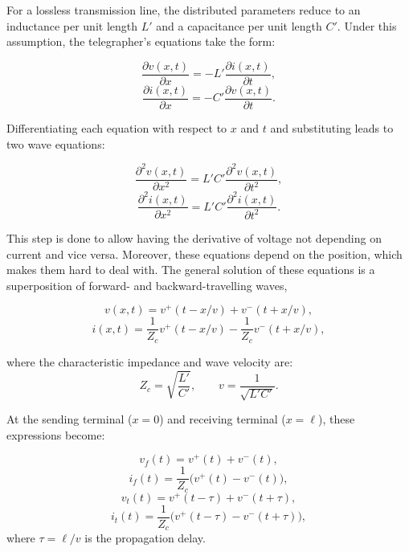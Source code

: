 For a lossless transmission line, the distributed parameters reduce to an inductance per unit length $L'$ and a capacitance per unit length $C'$.
Under this assumption, the telegrapher's equations take the form:

\begin{equation}
    \frac{\partial v(x,t)}{\partial x} = -L' \frac{\partial i(x,t)}{\partial t},
\end{equation}
\begin{equation}
    \frac{\partial i(x,t)}{\partial x} = -C' \frac{\partial v(x,t)}{\partial t}.
\end{equation}

Differentiating each equation with respect to $x$ and $t$ and substituting leads to two wave equations:

\begin{equation}
    \frac{\partial^2 v(x,t)}{\partial x^2} = L' C' \frac{\partial^2 v(x,t)}{\partial t^2},
\end{equation}
\begin{equation}
    \frac{\partial^2 i(x,t)}{\partial x^2} = L' C' \frac{\partial^2 i(x,t)}{\partial t^2}.
\end{equation}

This step is done to allow having the derivative of voltage not depending on current and vice versa. Moreover, these equations depend on the position,
which makes them hard to deal with.
The general solution of these equations is a superposition of forward- and backward-travelling waves,

\begin{equation}
    v(x,t) = v^{+}(t - x/v) + v^{-}(t + x/v),
\end{equation}
\begin{equation}
    i(x,t) = \frac{1}{Z_c} v^{+}(t - x/v) - \frac{1}{Z_c} v^{-}(t + x/v),
\end{equation}

where the characteristic impedance and wave velocity are:
\begin{equation}
    Z_c = \sqrt{\frac{L'}{C'}}, \qquad v = \frac{1}{\sqrt{L' C'}}.
\end{equation}

At the sending terminal ($x=0$) and receiving terminal ($x=\ell$), these expressions become:

\begin{equation}
    v_f(t) = v^{+}(t) + v^{-}(t),
\end{equation}
\begin{equation}
    i_f(t) = \frac{1}{Z_c}\big( v^{+}(t) - v^{-}(t) \big),
\end{equation}
\begin{equation}
    v_t(t) = v^{+}(t - \tau) + v^{-}(t + \tau),
\end{equation}
\begin{equation}
    i_t(t) = \frac{1}{Z_c}\big( v^{+}(t - \tau) - v^{-}(t + \tau) \big),
\end{equation}
where $\tau = \ell / v$ is the propagation delay.


